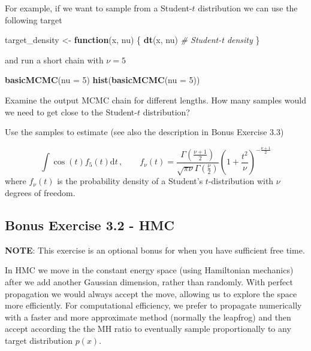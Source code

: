 \documentclass[
]{article}
\newenvironment{Shaded}{\begin{snugshade}}{\end{snugshade}}
\newcommand{\AttributeTok}[1]{\textcolor[rgb]{0.13,0.29,0.53}{#1}}
\newcommand{\CommentTok}[1]{\textcolor[rgb]{0.56,0.35,0.01}{\textit{#1}}}
\newcommand{\ControlFlowTok}[1]{\textcolor[rgb]{0.13,0.29,0.53}{\textbf{#1}}}
\newcommand{\DecValTok}[1]{\textcolor[rgb]{0.00,0.00,0.81}{#1}}
\newcommand{\FunctionTok}[1]{\textcolor[rgb]{0.13,0.29,0.53}{\textbf{#1}}}
\newcommand{\NormalTok}[1]{#1}
\newcommand{\OtherTok}[1]{\textcolor[rgb]{0.56,0.35,0.01}{#1}}
\begin{document}
For example, if we want to sample from a Student-\(t\) distribution we
can use the following target

\begin{Shaded}
\begin{Highlighting}[]
\NormalTok{target\_density }\OtherTok{\textless{}{-}} \ControlFlowTok{function}\NormalTok{(x, nu) \{}
  \FunctionTok{dt}\NormalTok{(x, nu) }\CommentTok{\# Student{-}t density}
\NormalTok{\}}
\end{Highlighting}
\end{Shaded}

and run a short chain with \(\nu = 5\)

\begin{Shaded}
\begin{Highlighting}[]
\FunctionTok{basicMCMC}\NormalTok{(}\AttributeTok{nu =} \DecValTok{5}\NormalTok{)}
\FunctionTok{hist}\NormalTok{(}\FunctionTok{basicMCMC}\NormalTok{(}\AttributeTok{nu =} \DecValTok{5}\NormalTok{))}
\end{Highlighting}
\end{Shaded}

Examine the output MCMC chain for different lengths. How many samples
would we need to get close to the Student-\(t\) distribution?

Use the samples to estimate (see also the description in Bonus Exercise
3.3)

\[\int \cos(t) f_5(t) \mathrm{d} t \, , \qquad f_{\nu}(t) = \frac{\Gamma\left(\frac{\nu+1}{2}\right)}{\sqrt{\pi\nu}\Gamma\left(\frac{\nu}{2}\right)}\left(1+\frac{t^2}{\nu}\right)^{-\frac{\nu+1}{2}}\]
where \(f_{\nu}(t)\) is the probability density of a Student's
\(t\)-distribution with \(\nu\) degrees of freedom.

\subsection{Bonus Exercise 3.2 - HMC}\label{bonus-exercise-3.2---hmc}

\textbf{NOTE}: This exercise is an optional bonus for when you have
sufficient free time.

In HMC we move in the constant energy space (using Hamiltonian
mechanics) after we add another Gaussian dimension, rather than
randomly. With perfect propagation we would always accept the move,
allowing us to explore the space more efficiently. For computational
efficiency, we prefer to propagate numerically with a faster and more
approximate method (normally the leapfrog) and then accept according the
the MH ratio to eventually sample proportionally to any target
distribution \(p(x)\).
\end{document}
